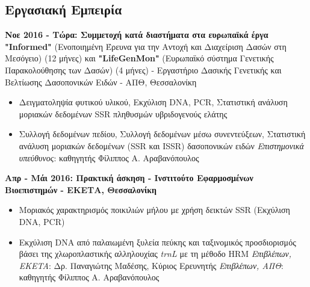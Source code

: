 \documentclass[12pt,]{scrartcl}
\begin{document}
\vspace{-3mm}

\subsection{Εργασιακή Εμπειρία}\label{Εμπειρία}
\vspace{-3mm}
\textbf{Νοε 2016 - Τώρα: Συμμετοχή κατά διαστήματα στα ευρωπαϊκά έργα "Informed"} (Ενοποιημένη Έρευνα για την Αντοχή και Διαχείριση Δασών στη Μεσόγειο) (12 μήνες) και \textbf{"LifeGenMon"} (Ευρωπαϊκό σύστημα Γενετικής Παρακολούθησης των Δασών) (4 μήνες) - Εργαστήριο Δασικής Γενετικής και Βελτίωσης Δασοπονικών Ειδών - ΑΠΘ, Θεσσαλονίκη 

\vspace{3mm}
\begin{itemize}
\vspace{-3mm}
\setlength\itemsep{-0.6em}
\item Δειγματοληψία φυτικού υλικού, Εκχύλιση DNA, PCR, Στατιστική ανάλυση μοριακών δεδομένων SSR πληθυσμών υβριδογενούς ελάτης
\item Συλλογή δεδομένων πεδίου, Συλλογή δεδομένων μέσω συνεντεύξεων, Στατιστική ανάλυση μοριακών δεδομένων (SSR και ISSR) δασοπονικών ειδών 
\vspace{2mm}
\newline
\textit{Επιστημονικά υπεύθυνος}: καθηγητής Φίλιππος Α. Αραβανόπουλος
\end{itemize}

\vspace{3mm}
\textbf{Απρ - Μάι 2016: Πρακτική άσκηση - Ινστιτούτο Εφαρμοσμένων Βιοεπιστημών - ΕΚΕΤΑ, Θεσσαλονίκη}


\vspace{3mm}
\begin{itemize}
\vspace{-3mm}
\setlength\itemsep{-0.6em}
\item Μοριακός χαρακτηρισμός ποικιλιών μήλου με χρήση δεικτών SSR (Εκχύλιση DNA, PCR) 
\item Εκχύλιση DNA από παλαιωμένη ξυλεία πεύκης και ταξινομικός προσδιορισμός βάσει της χλωροπλαστικής αλληλουχίας \textit{trnL} με τη μέθοδο HRM
\vspace{2mm}
\newline
\textit{Επιβλέπων, EKETA}: Δρ. Παναγιώτης Μαδέσης, Κύριος Ερευνητής
\newline
\textit{Επιβλέπων, ΑΠΘ}: καθηγητής Φίλιππος Α. Αραβανόπουλος
\end{itemize}
\end{document}
